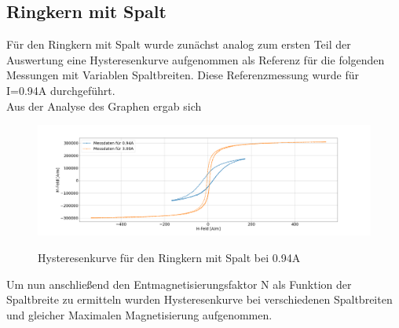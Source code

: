     \subsection{Ringkern mit Spalt}
        Für den Ringkern mit Spalt wurde zunächst analog zum ersten Teil der Auswertung eine Hysteresenkurve aufgenommen als Referenz für die folgenden Messungen mit Variablen Spaltbreiten.
        Diese Referenzmessung wurde für I=0.94A durchgeführt.\\
        Aus der Analyse des Graphen ergab sich
        \begin{figure}[H]
            \centering
            \includegraphics[width=\textwidth]{Images/Teil4.1.png}
            \label{Hyst4}
            \caption{Hysteresenkurve für den Ringkern mit Spalt bei 0.94A}
        \end{figure}
        Um nun anschließend den Entmagnetisierungsfaktor N als Funktion der Spaltbreite zu ermitteln wurden Hysteresenkurve bei verschiedenen Spaltbreiten und gleicher Maximalen Magnetisierung
        aufgenommen.

